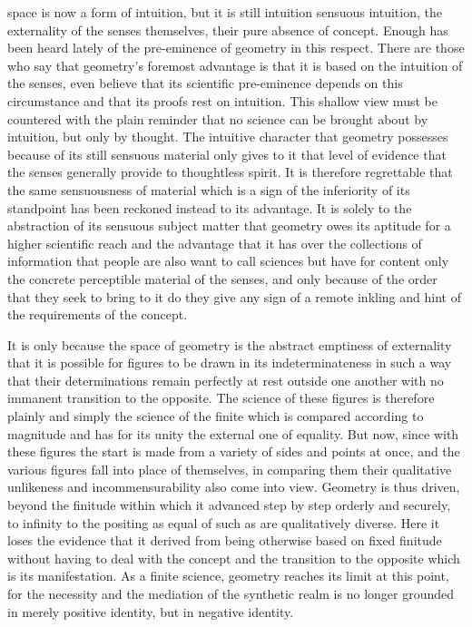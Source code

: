 space is now a form of intuition,
but it is still intuition
sensuous intuition,
the externality of the senses themselves,
their pure absence of concept.
Enough has been heard lately
of the pre-eminence of geometry in this respect.
There are those who say
that geometry's foremost advantage is
that it is based on the intuition of the senses,
even believe that its scientific pre-eminence
depends on this circumstance
and that its proofs rest on intuition.
This shallow view must be countered with
the plain reminder that no science can be
brought about by intuition, but only by thought.
The intuitive character that geometry possesses
because of its still sensuous material
only gives to it that level of evidence that
the senses generally provide to thoughtless spirit.
It is therefore regrettable that the same sensuousness of material
which is a sign of the inferiority of its standpoint
has been reckoned instead to its advantage.
It is solely to the abstraction of its sensuous subject matter
that geometry owes its aptitude for a higher scientific reach
and the advantage that it has over the collections of information
that people are also want to call sciences
but have for content only the concrete
perceptible material of the senses,
and only because of the order that they seek to bring to it
do they give any sign of a remote inkling and hint of
the requirements of the concept.

It is only because the space of geometry is
the abstract emptiness of externality
that it is possible for figures
to be drawn in its indeterminateness
in such a way that their determinations
remain perfectly at rest outside one another
with no immanent transition to the opposite.
The science of these figures is therefore
plainly and simply the science of the finite
which is compared according to magnitude
and has for its unity the external one of equality.
But now, since with these figures the start
is made from a variety of sides and points at once,
and the various figures fall into place of themselves,
in comparing them their qualitative unlikeness
and incommensurability also come into view.
Geometry is thus driven,
beyond the finitude within which
it advanced step by step orderly and securely,
to infinity to the positing as equal
of such as are qualitatively diverse.
Here it loses the evidence that it derived from
being otherwise based on fixed finitude
without having to deal with the concept
and the transition to the opposite
which is its manifestation.
As a finite science, geometry reaches its limit at this point,
for the necessity and the mediation of the synthetic realm is
no longer grounded in merely positive identity,
but in negative identity.

